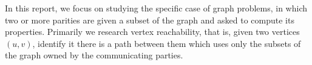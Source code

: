 In this report, we focus on studying the specific case of graph problems, in
which two or more parities are given a subset of the graph and asked to compute
its properties. Primarily we research vertex reachability, that is, given two
vertices $(u,v)$, identify it there is a path between them which uses only the
subsets of the graph owned by the communicating parties.
